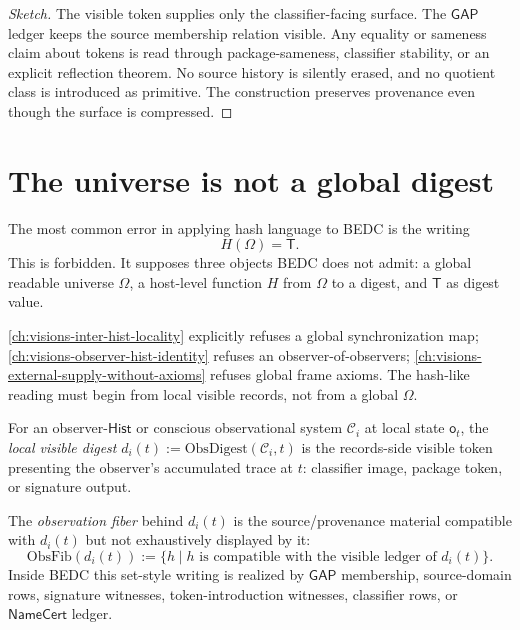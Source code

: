 \begin{proof}[Sketch]
The visible token supplies only the classifier-facing surface. The $\mathsf{GAP}$ ledger keeps the source membership relation visible. Any equality or sameness claim about tokens is read through package-sameness, classifier stability, or an explicit reflection theorem. No source history is silently erased, and no quotient class is introduced as primitive. The construction preserves provenance even though the surface is compressed.
\end{proof}

\section{The universe is not a global digest}
\label{sec:hash-like-no-universe-digest}

The most common error in applying hash language to BEDC is the writing
$$
H(\Omega) = \mathsf{T}.
$$
This is forbidden. It supposes three objects BEDC does not admit: a global readable universe $\Omega$, a host-level function $H$ from $\Omega$ to a digest, and $\mathsf{T}$ as digest value.

\autoref{ch:visions-inter-hist-locality} explicitly refuses a global synchronization map; \autoref{ch:visions-observer-hist-identity} refuses an observer-of-observers; \autoref{ch:visions-external-supply-without-axioms} refuses global frame axioms. The hash-like reading must begin from local visible records, not from a global $\Omega$.

\begin{definition}
\label{def:hash-like-local-visible-digest}
For an observer-$\mathsf{Hist}$ or conscious observational system $\mathcal{C}_i$ at local state $\mathsf{o}_t$, the \emph{local visible digest} $d_i(t) := \mathrm{ObsDigest}(\mathcal{C}_i, t)$ is the records-side visible token presenting the observer's accumulated trace at $t$: classifier image, package token, or signature output.
\end{definition}

\begin{definition}
\label{def:hash-like-observation-fiber}
The \emph{observation fiber} behind $d_i(t)$ is the source/provenance material compatible with $d_i(t)$ but not exhaustively displayed by it:
$$
\mathrm{ObsFib}(d_i(t)) := \{ h \mid h \text{ is compatible with the visible ledger of } d_i(t) \}.
$$
Inside BEDC this set-style writing is realized by $\mathsf{GAP}$ membership, source-domain rows, signature witnesses, token-introduction witnesses, classifier rows, or $\mathsf{NameCert}$ ledger.
\end{definition}

